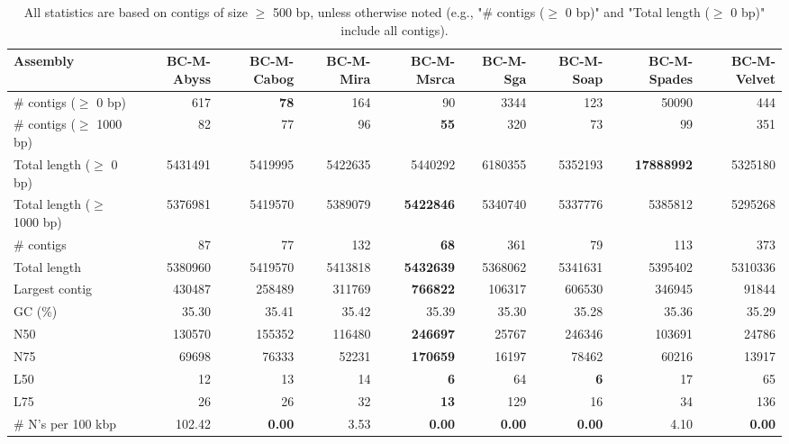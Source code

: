 \documentclass[12pt,a4paper]{article}
\begin{document}
\begin{table}[ht]
\begin{center}
\caption{All statistics are based on contigs of size $\geq$ 500 bp, unless otherwise noted (e.g., "\# contigs ($\geq$ 0 bp)" and "Total length ($\geq$ 0 bp)" include all contigs).}
\begin{tabular}{|l*{8}{|r}|}
\hline
Assembly & BC-M-Abyss & BC-M-Cabog & BC-M-Mira & BC-M-Msrca & BC-M-Sga & BC-M-Soap & BC-M-Spades & BC-M-Velvet \\ \hline
\# contigs ($\geq$ 0 bp) & 617 & {\bf 78} & 164 & 90 & 3344 & 123 & 50090 & 444 \\ \hline
\# contigs ($\geq$ 1000 bp) & 82 & 77 & 96 & {\bf 55} & 320 & 73 & 99 & 351 \\ \hline
Total length ($\geq$ 0 bp) & 5431491 & 5419995 & 5422635 & 5440292 & 6180355 & 5352193 & {\bf 17888992} & 5325180 \\ \hline
Total length ($\geq$ 1000 bp) & 5376981 & 5419570 & 5389079 & {\bf 5422846} & 5340740 & 5337776 & 5385812 & 5295268 \\ \hline
\# contigs & 87 & 77 & 132 & {\bf 68} & 361 & 79 & 113 & 373 \\ \hline
Total length & 5380960 & 5419570 & 5413818 & {\bf 5432639} & 5368062 & 5341631 & 5395402 & 5310336 \\ \hline
Largest contig & 430487 & 258489 & 311769 & {\bf 766822} & 106317 & 606530 & 346945 & 91844 \\ \hline
GC (\%) & 35.30 & 35.41 & 35.42 & 35.39 & 35.30 & 35.28 & 35.36 & 35.29 \\ \hline
N50 & 130570 & 155352 & 116480 & {\bf 246697} & 25767 & 246346 & 103691 & 24786 \\ \hline
N75 & 69698 & 76333 & 52231 & {\bf 170659} & 16197 & 78462 & 60216 & 13917 \\ \hline
L50 & 12 & 13 & 14 & {\bf 6} & 64 & {\bf 6} & 17 & 65 \\ \hline
L75 & 26 & 26 & 32 & {\bf 13} & 129 & 16 & 34 & 136 \\ \hline
\# N's per 100 kbp & 102.42 & {\bf 0.00} & 3.53 & {\bf 0.00} & {\bf 0.00} & {\bf 0.00} & 4.10 & {\bf 0.00} \\ \hline
\end{tabular}
\end{center}
\end{table}
\end{document}
